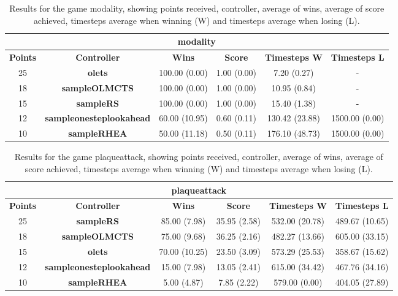 \begin{table*}[!t]
\begin{center}
\begin{tabular}{|c|c|c|c|c|c|}
\multicolumn{6}{c}{\textbf{modality}}\\
\hline
\textbf{Points} & \textbf{Controller} & \textbf{Wins} &  \textbf{Score} & \textbf{Timesteps W} & \textbf{Timesteps L}\\
\hline
25 & \textbf{olets} & 100.00 (0.00) & 1.00 (0.00) & 7.20 (0.27) &  - 
 \\
\hline
18 & \textbf{sampleOLMCTS} & 100.00 (0.00) & 1.00 (0.00) & 10.95 (0.84) &  - 
 \\
\hline
15 & \textbf{sampleRS} & 100.00 (0.00) & 1.00 (0.00) & 15.40 (1.38) &  - 
 \\
\hline
12 & \textbf{sampleonesteplookahead} & 60.00 (10.95) & 0.60 (0.11) & 130.42 (23.88) & 1500.00 (0.00)
 \\
\hline
10 & \textbf{sampleRHEA} & 50.00 (11.18) & 0.50 (0.11) & 176.10 (48.73) & 1500.00 (0.00)
 \\
\hline
\end{tabular}
\caption{Results for the game modality, showing points received, controller, average of wins, average of score achieved, timesteps average when winning (W) and timesteps average when losing (L).}
\label{tab:weights}
\end{center}
\end{table*}
\begin{table*}[!t]
\begin{center}
\begin{tabular}{|c|c|c|c|c|c|}
\multicolumn{6}{c}{\textbf{plaqueattack}}\\
\hline
\textbf{Points} & \textbf{Controller} & \textbf{Wins} &  \textbf{Score} & \textbf{Timesteps W} & \textbf{Timesteps L}\\
\hline
25 & \textbf{sampleRS} & 85.00 (7.98) & 35.95 (2.58) & 532.00 (20.78) & 489.67 (10.65)
 \\
\hline
18 & \textbf{sampleOLMCTS} & 75.00 (9.68) & 36.25 (2.16) & 482.27 (13.66) & 605.00 (33.15)
 \\
\hline
15 & \textbf{olets} & 70.00 (10.25) & 23.50 (3.09) & 573.29 (25.53) & 358.67 (15.62)
 \\
\hline
12 & \textbf{sampleonesteplookahead} & 15.00 (7.98) & 13.05 (2.41) & 615.00 (34.42) & 467.76 (34.16)
 \\
\hline
10 & \textbf{sampleRHEA} & 5.00 (4.87) & 7.85 (2.22) & 579.00 (0.00) & 404.05 (27.89)
 \\
\hline
\end{tabular}
\caption{Results for the game plaqueattack, showing points received, controller, average of wins, average of score achieved, timesteps average when winning (W) and timesteps average when losing (L).}
\label{tab:weights}
\end{center}
\end{table*}
